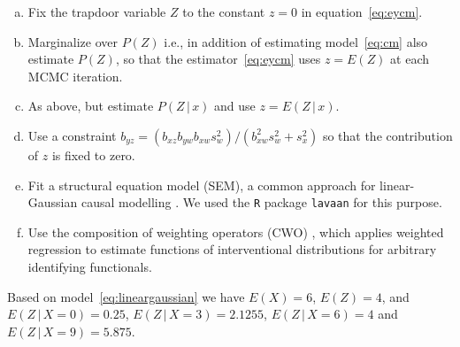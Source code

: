 \documentclass[11pt,a4paper,twoside]{article}
\newcommand{\+}[1]{\ensuremath{\mathbf{#1}}}
\newcommand{\given}{{ \, | \, }}
\begin{document}
	\begin{enumerate}[(a),leftmargin=*]
		\itemsep=0em
		\item Fix the trapdoor variable $Z$ to the constant $z=0$ in equation~\eqref{eq:eycm}.
		\item Marginalize over $P(Z)$ i.e., in addition of estimating model~\eqref{eq:cm} also estimate $P(Z)$, so that the estimator~\eqref{eq:eycm} uses $z = E(Z)$ at each MCMC iteration.
		\item As above, but estimate $P(Z \given  x)$ and use $z = E(Z \given x)$.
		\item Use a constraint $b_{yz} = (b_{xz}b_{yw} b_{xw} s_w^2)/(b_{xw}^2 s_w^2+s_x^2)$ so that the contribution of $z$ is fixed to zero.
		\item Fit a structural equation model (SEM), a common approach for linear-Gaussian causal modelling \citep{Kline2011}. We used the \texttt{R} package \texttt{lavaan} \citep{lavaan} for this purpose.
		\item Use the composition of weighting operators (CWO) \citep{jung2020}, which applies weighted regression to estimate functions of interventional distributions for arbitrary identifying functionals.
	\end{enumerate}
	Based on model~\eqref{eq:lineargaussian} we have $E(X) = 6$, $E(Z) = 4$, and $E(Z \given  X = 0) = 0.25$, $E(Z \given  X =3) = 2.1255$, $E(Z \given  X =6) = 4$ and $E(Z \given  X =9) = 5.875$. 
	
\end{document}
